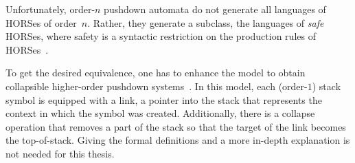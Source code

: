 \documentclass[../../diss.tex]{subfiles}
\begin{document}
Unfortunately, order-$n$ pushdown automata do not generate all languages of HORSes of order~$n$.
Rather, they generate a subclass, the languages of \emph{safe} HORSes, where safety is a syntactic restriction on the production rules of HORSes~\cite{DammG86,KnapikNU02}.

To get the desired equivalence, one has to enhance the model to obtain collapsible higher-order pushdown systems~\cite{HagueMOS17}.
In this model, each (order-$1$) stack symbol is equipped with a link, a pointer into the stack that represents the context in which the symbol was created.
Additionally, there is a collapse operation that removes a part of the stack so that the target of the link becomes the top-of-stack.
Giving the formal definitions and a more in-depth explanation is not needed for this thesis.
\end{document}
